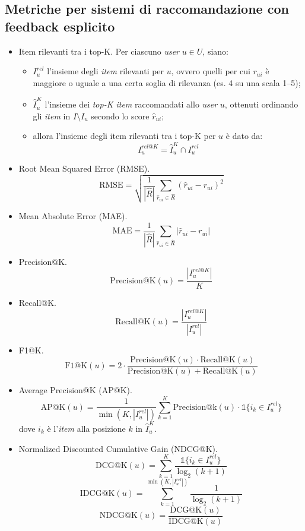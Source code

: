 \documentclass{article}
\begin{document}
\subsection*{Metriche per sistemi di raccomandazione con feedback esplicito}

\begin{itemize}
    \item Item rilevanti tra i top-K. Per ciascuno \textit{user} $u \in U$, siano:
    \begin{itemize}
        \item $I_u^{rel}$ l'insieme degli \textit{item} rilevanti per $u$, ovvero quelli per cui $r_{ui}$ è maggiore o uguale a una certa soglia di rilevanza (es. 4 su una scala 1--5);
        \item $\hat{I}_u^K$ l'insieme dei \textit{top-K item} raccomandati allo \textit{user} $u$, ottenuti ordinando gli \textit{item} in $I \setminus I_u$ secondo lo score $\hat{r}_{ui}$;
        \item allora l'insieme degli item rilevanti tra i top-K per $u$ è dato da:
        \[
        I_u^{rel@K} = \hat{I}_u^K \cap I_u^{rel}
        \]
    \end{itemize}
    
    \item Root Mean Squared Error (RMSE).
    \[
    \text{RMSE} = \sqrt{ \frac{1}{|\hat{R}|} \sum_{\hat{r}_{ui} \in \hat{R}} (\hat{r}_{ui} - r_{ui})^2 }
    \]
    
    \item Mean Absolute Error (MAE).
    \[
    \text{MAE} = \frac{1}{|\hat{R}|} \sum_{\hat{r}_{ui} \in \hat{R}} |\hat{r}_{ui} - r_{ui}|
    \]
    
    \item Precision@K.
    \[
    \text{Precision@K}(u) = \frac{|I_u^{rel@K}|}{K}
    \]
    
    \item Recall@K.
    \[
    \text{Recall@K}(u) = \frac{|I_u^{rel@K}|}{|I_u^{rel}|}
    \]
    
    \item F1@K.
    \[
    \text{F1@K}(u) = 2 \cdot \frac{\text{Precision@K}(u) \cdot \text{Recall@K}(u)}{\text{Precision@K}(u) + \text{Recall@K}(u)}
    \]
    
    \item Average Precision@K (AP@K).
    \[
    \text{AP@K}(u) = \frac{1}{\min(K, |I_u^{rel}|)} \sum_{k=1}^{K} \text{Precision@k}(u) \cdot \mathbb{1}\{i_k \in I_u^{rel}\}
    \]
    dove $i_k$ è l'\textit{item} alla posizione $k$ in $\hat{I}_u^K$.
    
    \item Normalized Discounted Cumulative Gain (NDCG@K).
    \[
    \text{DCG@K}(u) = \sum_{k=1}^{K} \frac{\mathbb{1}\{i_k \in I_u^{rel}\}}{\log_2(k + 1)}
    \]
    \[
    \text{IDCG@K}(u) = \sum_{k=1}^{\min(K, |I_u^{rel}|)} \frac{1}{\log_2(k + 1)}
    \]
    \[
    \text{NDCG@K}(u) = \frac{\text{DCG@K}(u)}{\text{IDCG@K}(u)}
    \]
\end{itemize}




\end{document}
